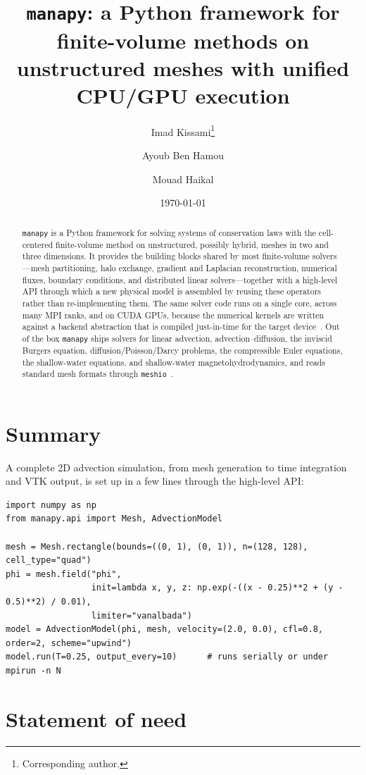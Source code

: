 \documentclass[11pt]{article}
\title{\texttt{manapy}: a Python framework for finite-volume methods on
unstructured meshes with unified CPU/GPU execution}
\author[1]{Imad Kissami\thanks{Corresponding author.}}
\author[1]{Ayoub Ben Hamou}
\author[1]{Mouad Haikal}
\affil[1]{Mohammed VI Polytechnic University (UM6P), Morocco}
\date{\today}
\begin{document}
\maketitle

\begin{abstract}
\texttt{manapy} is a Python framework for solving systems of conservation laws
with the cell-centered finite-volume method on unstructured, possibly hybrid,
meshes in two and three dimensions. It provides the building blocks shared by
most finite-volume solvers---mesh partitioning, halo exchange, gradient and
Laplacian reconstruction, numerical fluxes, boundary conditions, and distributed
linear solvers---together with a high-level API through which a new physical
model is assembled by reusing these operators rather than re-implementing them.
The same solver code runs on a single core, across many MPI ranks, and on CUDA
GPUs, because the numerical kernels are written against a backend abstraction
that is compiled just-in-time for the target device~\citep{lam2015numba}. Out of
the box \texttt{manapy} ships solvers for linear advection, advection--diffusion,
the inviscid Burgers equation, diffusion/Poisson/Darcy problems, the compressible
Euler equations, the shallow-water equations, and shallow-water
magnetohydrodynamics, and reads standard mesh formats through
\texttt{meshio}~\citep{meshio}.
\end{abstract}

\section{Summary}

A complete 2D advection simulation, from mesh generation to time integration and
VTK output, is set up in a few lines through the high-level API:

\begin{lstlisting}
import numpy as np
from manapy.api import Mesh, AdvectionModel

mesh = Mesh.rectangle(bounds=((0, 1), (0, 1)), n=(128, 128), cell_type="quad")
phi = mesh.field("phi",
                 init=lambda x, y, z: np.exp(-((x - 0.25)**2 + (y - 0.5)**2) / 0.01),
                 limiter="vanalbada")
model = AdvectionModel(phi, mesh, velocity=(2.0, 0.0), cfl=0.8, order=2, scheme="upwind")
model.run(T=0.25, output_every=10)      # runs serially or under mpirun -n N
\end{lstlisting}

\section{Statement of need}
\end{document}
